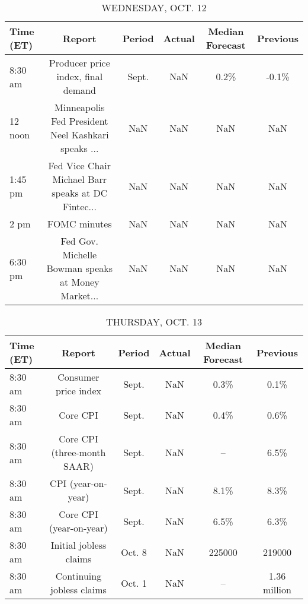 \documentclass{article}%
\begin{document}
\begin{table}[htbp]%
\caption{WEDNESDAY, OCT. 12}%
\centering%
\begin{adjustbox}{width=1\textwidth}%
\begin{tabular}{lccccc}
\toprule
Time (ET) &                                             Report & Period & Actual & Median Forecast & Previous \\
\midrule
  8:30 am &                 Producer price index, final demand &  Sept. &    NaN &            0.2\% &    -0.1\% \\
  12 noon & Minneapolis Fed President Neel Kashkari speaks ... &    NaN &    NaN &             NaN &      NaN \\
  1:45 pm & Fed Vice Chair Michael Barr speaks at DC Fintec... &    NaN &    NaN &             NaN &      NaN \\
     2 pm &                                       FOMC minutes &    NaN &    NaN &             NaN &      NaN \\
  6:30 pm & Fed Gov. Michelle Bowman speaks at Money Market... &    NaN &    NaN &             NaN &      NaN \\
\bottomrule
\end{tabular}
%
\end{adjustbox}%
\end{table}

%


\begin{table}[htbp]%
\caption{THURSDAY, OCT. 13}%
\centering%
\begin{adjustbox}{width=1\textwidth}%
\begin{tabular}{lccccc}
\toprule
Time (ET) &                      Report & Period & Actual & Median Forecast &     Previous \\
\midrule
  8:30 am &        Consumer price index &  Sept. &    NaN &            0.3\% &         0.1\% \\
  8:30 am &                    Core CPI &  Sept. &    NaN &            0.4\% &         0.6\% \\
  8:30 am & Core CPI (three-month SAAR) &  Sept. &    NaN &              -- &         6.5\% \\
  8:30 am &          CPI (year-on-year) &  Sept. &    NaN &            8.1\% &         8.3\% \\
  8:30 am &     Core CPI (year-on-year) &  Sept. &    NaN &            6.5\% &         6.3\% \\
  8:30 am &      Initial jobless claims & Oct. 8 &    NaN &          225000 &       219000 \\
  8:30 am &   Continuing jobless claims & Oct. 1 &    NaN &              -- & 1.36 million \\
\bottomrule
\end{tabular}
%
\end{adjustbox}%
\end{table}
\end{document}
